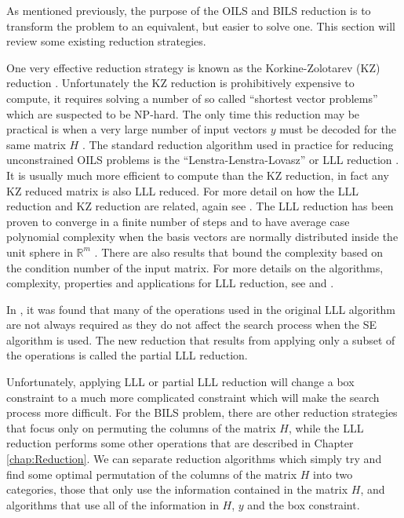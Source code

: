 \documentclass[12pt,Bold,letterpaper]{mcgilletdclass}
\begin{document}
As mentioned previously, the purpose of the OILS and BILS reduction is to transform the problem to an equivalent, but easier to solve one. This section will review some existing reduction strategies.

One very effective reduction strategy is known as the Korkine-Zolotarev (KZ) 
reduction \cite{KorZ73}. Unfortunately the KZ reduction is prohibitively expensive to compute,
it requires solving a number of so called ``shortest vector problems'' which are suspected to be NP-hard. The only time this reduction
may be practical is when a very large number of input vectors $y$ must be
decoded for the same matrix $H$ \cite{AgrEVZ02}. The standard reduction algorithm used in practice for reducing unconstrained OILS problems is the ``Lenstra-Lenstra-Lovasz'' or LLL
reduction \cite{LenLL82}. It is usually much more efficient to compute than the
KZ reduction, in fact any KZ reduced matrix is also LLL reduced. For more detail
on how the LLL reduction and KZ reduction are related, again see
\cite{AgrEVZ02}. The LLL reduction has been proven to converge in a finite
number of steps and to have average case polynomial complexity when the basis
vectors are normally distributed inside the unit sphere in $\mathbb{R}^m$ \cite{LinMH10}. There
are also results that bound the complexity based on the condition number of the
input matrix. For more details on the algorithms, complexity, properties and applications for LLL
reduction, see \cite{WubSJM11} and \cite{NguV10}.

In \cite{XieCB11}, it was found that many of the operations used in the original LLL algorithm are not always required as they do not affect the search process when the SE algorithm is used. The new reduction that results from applying only a subset of the operations is called the partial LLL reduction.

Unfortunately, applying LLL or partial LLL reduction will change a box constraint to a much more complicated constraint which will make the search process more difficult. For the BILS problem, there are other reduction strategies that focus only on permuting the columns of the matrix $H$, while the LLL reduction performs some other operations that are described in Chapter \ref{chap:Reduction}. We can separate reduction algorithms which simply try and find some optimal permutation of the columns of the matrix $H$ into two categories, those that only use the information contained in the matrix $H$, and algorithms that use all of the information in $H$, $y$ and the box constraint.
\end{document}
